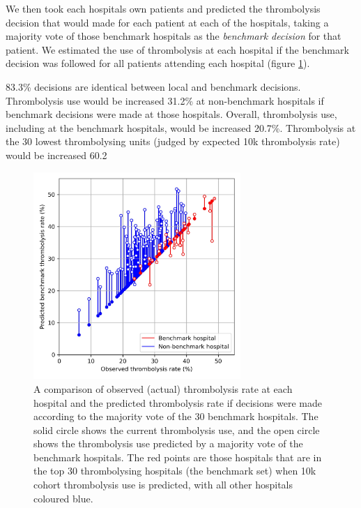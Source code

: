 We then took each hospitals own patients and predicted the thrombolysis decision that would made for each patient at each of the hospitals, taking a majority vote of those benchmark hospitals as the \emph{benchmark decision} for that patient. We estimated the use of thrombolysis at each hospital if the benchmark decision was followed for all patients attending each hospital (figure \ref{fig:benchmark}).

83.3\% decisions are identical between local and benchmark decisions. Thrombolysis use would be increased 31.2\% at non-benchmark hospitals if benchmark decisions were made at those hospitals. Overall, thrombolysis use, including at the benchmark hospitals, would be increased 20.7\%. Thrombolysis at the 30 lowest thrombolysing units (judged by expected 10k thrombolysis rate) would be increased 60.2%


\begin{figure}
\centering
\includegraphics[width=0.7\textwidth]{./images/05_benchmark_thrombolysis_key_features}
\caption{A comparison of observed (actual) thrombolysis rate at each hospital and the predicted thrombolysis rate if decisions were made according to the majority vote of the 30 benchmark hospitals. The solid circle shows the current thrombolysis use, and the open circle shows the thrombolysis use predicted by a majority vote of the benchmark hospitals. The red points are those hospitals that are in the top 30 thrombolysing hospitals (the benchmark set) when 10k cohort thrombolysis use is predicted, with all other hospitals coloured blue.}
\label{fig:benchmark}
\end{figure}



